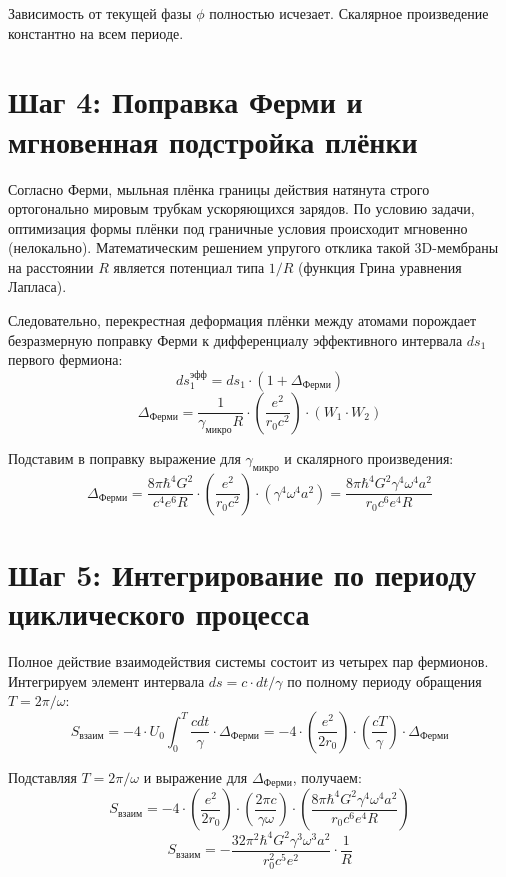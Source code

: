 \documentclass[12pt,a4paper]{article}
\begin{document}
Зависимость от текущей фазы $\phi$ полностью исчезает. Скалярное произведение константно на всем периоде.

\section*{Шаг 4: Поправка Ферми и мгновенная подстройка плёнки}

Согласно Ферми, мыльная плёнка границы действия натянута строго ортогонально мировым трубкам ускоряющихся зарядов. По условию задачи, оптимизация формы плёнки под граничные условия происходит мгновенно (нелокально). Математическим решением упругого отклика такой 3D-мембраны на расстоянии $R$ является потенциал типа $1/R$ (функция Грина уравнения Лапласа).

Следовательно, перекрестная деформация плёнки между атомами порождает безразмерную поправку Ферми к дифференциалу эффективного интервала $ds_1$ первого фермиона:
\begin{equation}
ds_1^{эфф} = ds_1 \cdot (1 + \Delta_{Ферми})
\end{equation}
\begin{equation}
\Delta_{Ферми} = \frac{1}{\gamma_{микро} R} \cdot \left(\frac{e^2}{r_0 c^2}\right) \cdot (W_1 \cdot W_2)
\end{equation}

Подставим в поправку выражение для $\gamma_{микро}$ и скалярного произведения:
\begin{equation}
\Delta_{Ферми} = \frac{8\pi \hbar^4 G^2}{c^4 e^6 R} \cdot \left(\frac{e^2}{r_0 c^2}\right) \cdot (\gamma^4 \omega^4 a^2) = \frac{8\pi \hbar^4 G^2 \gamma^4 \omega^4 a^2}{r_0 c^6 e^4 R}
\end{equation}

\section*{Шаг 5: Интегрирование по периоду циклического процесса}

Полное действие взаимодействия системы состоит из четырех пар фермионов. Интегрируем элемент интервала $ds = c \cdot dt / \gamma$ по полному периоду обращения $T = 2\pi/\omega$:
\begin{equation}
S_{взаим} = - 4 \cdot U_0 \int_0^T \frac{c dt}{\gamma} \cdot \Delta_{Ферми} = - 4 \cdot \left(\frac{e^2}{2r_0}\right) \cdot \left(\frac{c T}{\gamma}\right) \cdot \Delta_{Ферми}
\end{equation}

Подставляя $T = 2\pi/\omega$ и выражение для $\Delta_{Ферми}$, получаем:
\begin{equation}
S_{взаим} = - 4 \cdot \left(\frac{e^2}{2r_0}\right) \cdot \left(\frac{2\pi c}{\gamma \omega}\right) \cdot \left( \frac{8\pi \hbar^4 G^2 \gamma^4 \omega^4 a^2}{r_0 c^6 e^4 R} \right)
\end{equation}
\begin{equation}
S_{взаим} = - \frac{32\pi^2 \hbar^4 G^2 \gamma^3 \omega^3 a^2}{r_0^2 c^5 e^2} \cdot \frac{1}{R}
\end{equation}
\end{document}
